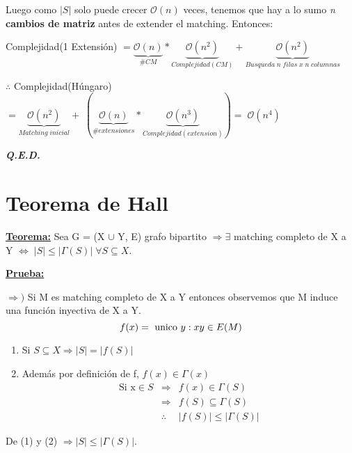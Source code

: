 \documentclass[12pt,a4paper]{report}
\newcommand{\QED}{\hfill \textit{\textbf{Q.E.D.}}}
\begin{document}
\begin{enumerate}
					\par Luego como $\lvert S \rvert$ solo puede crecer $\mathcal{O}(n)$ veces, tenemos que hay a lo sumo \textit{n} \textbf{cambios de matriz} antes de extender el matching. Entonces:
						\begin{center}
							\par Complejidad(1 Extensión) $= \underbrace{\mathcal{O}(n)}_{\# CM} * \underbrace{\mathcal{O}(n^{2})}_{Complejidad(CM)} + \underbrace{\mathcal{O}(n^{2})}_{Busqueda \; \textit{n} \; filas \; x \; \textit{n} \; columnas }$ \\

							\vspace{5mm}
							\par $\therefore$ Complejidad(Húngaro) $= \underbrace{\mathcal{O}(n^{2})}_{Matching \; inicial} + \; (\underbrace{\mathcal{O}(n)}_{\#extensiones} * \underbrace{\mathcal{O}(n^{3})}_{Complejidad(extension)}) = \; \mathcal{O}(n^{4})$
						\end{center}
			\end{enumerate}

		\QED

	\section{Teorema de Hall}
		\textbf{\underline{Teorema:}} Sea G = (X $\cup$ Y, E) grafo bipartito $\Rightarrow \exists$ matching completo de X a Y $\Leftrightarrow \; \lvert S \rvert \leq \lvert \Gamma(S) \rvert \; \forall S \subseteq X$.

		\vspace{3mm}
		\textbf{\underline{Prueba:}}
			\par $\Rightarrow)$ Si M es matching completo de X a Y entonces observemos que M induce una función inyectiva de X a Y.
			\[ f(x) = \textup{ unico } y : xy \in E(M) \]

			\begin{enumerate}
				\item Si $S \subseteq X \Rightarrow \lvert S \rvert = \lvert f(S) \rvert$
				\item Además por definición de f, $f(x) \in \Gamma(x)$
					\begin{eqnarray}
						\nonumber \text{Si x} \in S &\Rightarrow & f(x) \in \Gamma(S) \\
						\nonumber &\Rightarrow & f(S) \subseteq \Gamma(S) \\
						\nonumber &\therefore & \lvert f(S) \rvert \leq \lvert \Gamma(S) \rvert
					\end{eqnarray}
			\end{enumerate}
			\par De (1) y (2) $\Rightarrow \lvert S \rvert \leq \lvert \Gamma(S) \rvert$.
\end{document}
